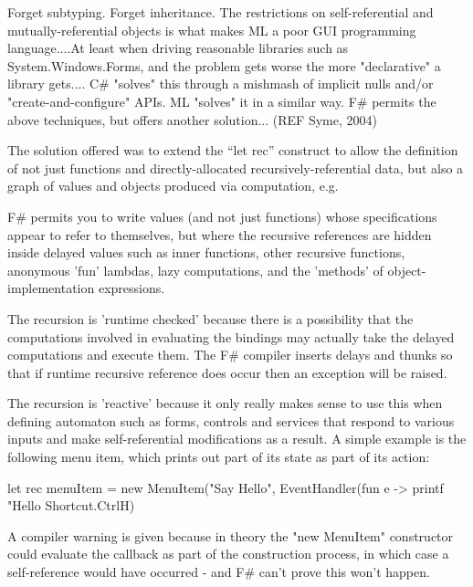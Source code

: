\documentclass[acmsmall,review]{acmart}\settopmatter{printfolios=true,printccs=false,printacmref=false}
\begin{document}
\begin{verbquote}
Forget subtyping.  Forget inheritance.   The restrictions on self-referential and mutually-referential objects is what makes ML a poor GUI programming language....At least when driving reasonable libraries such as System.Windows.Forms, and the problem gets worse the more "declarative" a library gets.... C\# "solves" this through a mishmash of implicit nulls and/or "create-and-configure" APIs.   ML "solves" it in a similar way.  F\# permits the above techniques, but offers another solution... (REF Syme, 2004)
\end{verbquote}

The solution offered was to extend the “let rec” construct to allow the definition of not just functions and directly-allocated recursively-referential data, but also a graph of values and objects produced via computation, e.g.


\begin{verbquote}
F\# permits you to write values (and not just functions) whose specifications appear to refer to themselves, but where the recursive references are hidden inside delayed values such as inner functions, other recursive functions, anonymous 'fun' lambdas, lazy computations, and the 'methods' of object-implementation expressions. 

The recursion is 'runtime checked' because there is a possibility that the computations involved in evaluating the bindings may actually take the delayed computations and execute them. The F\# compiler inserts delays and thunks so that if runtime recursive reference does occur then an exception will be raised.

The recursion is 'reactive' because it only really makes sense to use this when defining automaton such as forms, controls and services that respond to various inputs and make self-referential modifications as a result. A simple example is the following menu item, which prints out part of its state as part of its action:

   let rec menuItem = 
      new MenuItem("Say Hello", 
                   EventHandler(fun e -> printf "Hello %
                   Shortcut.CtrlH)

A compiler warning is given because in theory the "new MenuItem" constructor could evaluate the callback as part of the construction process, in which case a self-reference would have occurred - and F\# can't prove this won't happen. 
\end{verbquote}
\end{document}
